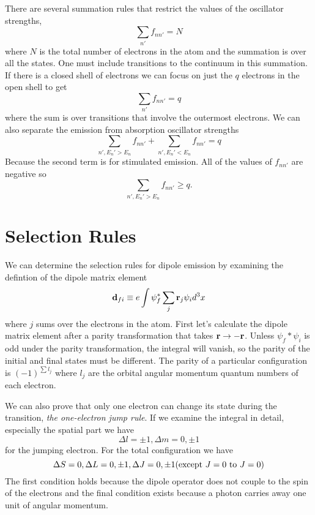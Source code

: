 There are several summation rules that restrict the values of the
oscillator strengths,
\begin{equation}
\sum_{n'} f_{nn'} = N
\label{eq:534}
\end{equation}
where $N$ is the total number of electrons in the atom and the
summation is over all the states.  One must include transitions to the
continuum in this summation.  If there is a closed shell of electrons
we can focus on just the $q$ electrons in the open shell to get
\begin{equation}
\sum_{n'} f_{nn'} = q
\label{eq:535}
\end{equation}
where the sum is over transitions that involve the outermost
electrons.  We can also separate the emission from absorption
oscillator strengths
\begin{equation}
\sum_{n', E_n'>E_n} f_{nn'} + 
\sum_{n', E_n'<E_n} f_{nn'} = q
\label{eq:536}
\end{equation}
Because the second term is for stimulated emission.  All of the values
of $f_{nn'}$ are negative so
\begin{equation}
\sum_{n', E_n'>E_n} f_{nn'} \ge q.
\label{eq:537}
\end{equation}

\section{Selection Rules}
\label{sec:selection-rules}
We can determine the selection rules for dipole emission by examining
the defintion of the dipole matrix element
\begin{equation}
{\bf d}_{fi} \equiv e \int \psi_f^* \sum_j {\bf r}_j \psi_i d^3 x
\label{eq:538}
\end{equation}
where $j$ sums over the electrons in the atom.
First let's calculate the dipole matrix element after a parity
transformation that takes ${\bf r} \rightarrow -{\bf r}$.  Unless
$\psi_f* \psi_i$ is odd under the parity transformation, the integral
will vanish, so the parity of the initial and final states must be
different. The parity of a particular configuration is $(-1)^{\sum
  l_j}$ where $l_j$ are the orbital angular momentum quantum numbers
of each electron.

We can also prove that only one electron can change its state during
the transition, {\em the one-electron jump rule}.  If we examine the
integral in detail, especially the spatial part we have
\begin{equation}
\Delta l = \pm 1, \Delta m = 0, \pm 1
\label{eq:539}
\end{equation}
for the jumping electron.  For the total configuration we have
\begin{equation}
\Delta S=0,  \Delta L=0, \pm 1, \Delta J=0, \pm 1 (\hbox{\rm except}~ J=0
~\hbox{\rm to}~ J=0)
\label{eq:540}
\end{equation}
The first condition holds because the dipole operator does not couple
to the spin of the electrons and the final condition exists because a
photon carries away one unit of angular momentum.

